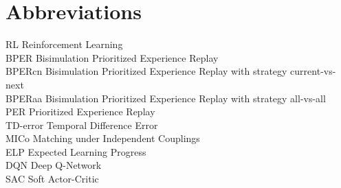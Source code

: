 
\chapter*{Abbreviations}

\begin{flushleft}

RL \hfill  Reinforcement Learning \\
BPER \hfill Bisimulation Prioritized Experience Replay \\
BPERcn \hfill Bisimulation Prioritized Experience Replay with strategy current-vs-next \\
BPERaa \hfill Bisimulation Prioritized Experience Replay with strategy all-vs-all \\
PER \hfill Prioritized Experience Replay \\
TD-error \hfill Temporal Difference Error \\
MICo \hfill Matching under Independent Couplings \\
ELP \hfill Expected Learning Progress \\
DQN \hfill Deep Q-Network \\
SAC \hfill Soft Actor-Critic
\end{flushleft}